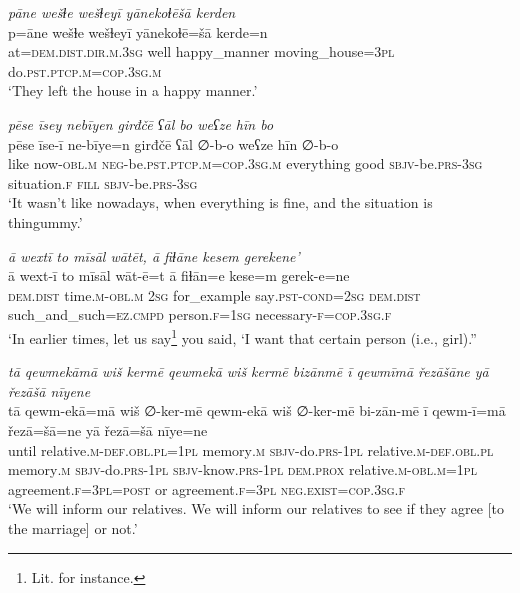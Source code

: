 \ea \label{ŽE.71}
\textit{pāne wešɫe wešɫeyī yānekoɫēšā kerden} \\ 
\gll p=āne wešɫe wešɫeyī yānekoɫē=šā kerde=n \\ 
 at=\textsc{dem.dist}\textsc{.dir}\textsc{.m}\textsc{.3sg} well happy\_manner moving\_house\textsc{=3pl} do\textsc{.pst}\textsc{.ptcp}\textsc{.m}\textsc{=cop}\textsc{.3sg}\textsc{.m} \\ 
\glt `They left the house in a happy manner.'
\z 
 
\ea \label{ŽE.72}
\textit{pēse īsey nebīyen girđčē ʕāl bo weʕze hīn bo} \\ 
\gll pēse īse-ī ne-bīye=n girđčē ʕāl ∅-b-o weʕze hīn ∅-b-o \\ 
  like now\textsc{-obl}\textsc{.m} \textsc{neg-}be\textsc{.pst}\textsc{.ptcp}\textsc{.m}\textsc{=cop}\textsc{.3sg}\textsc{.m} everything good \textsc{sbjv-}be\textsc{.prs}\textsc{-3sg} situation\textsc{.f} \textsc{fill} \textsc{sbjv-}be\textsc{.prs}\textsc{-3sg} \\ 
\glt `It wasn’t like nowadays, when everything is fine, and the situation is thingummy.'
\z 
 
\ea \label{ŽE.73}
\textit{ā wextī to mīsāl wātēt, ā fiɫāne kesem gerekene’} \\ 
\gll ā wext-ī to mīsāl wāt-ē=t ā fiɫān=e kese=m gerek-e=ne \\ 
 \textsc{dem.dist} time\textsc{.m}\textsc{-obl}\textsc{.m} \textsc{2sg} for\_example say\textsc{.pst}\textsc{-cond}\textsc{=\textsc{2sg}} \textsc{dem.dist} such\_and\_such\textsc{=ez}\textsc{.cmpd} person\textsc{.f}\textsc{=\textsc{1sg}} necessary\textsc{-f}\textsc{=cop}\textsc{.3sg}\textsc{.f} \\ 
\glt `In earlier times, let us say\footnote{Lit. for instance.} you said, ‘I want that certain person (i.e., girl).''
\z 
 
\ea \label{ŽE.83}
\textit{tā qewmekāmā wiš kermē qewmekā wiš kermē bizānmē ī qewmīmā řezāšāne yā řezāšā nīyene} \\ 
\gll tā qewm-ekā=mā wiš ∅-ker-mē qewm-ekā wiš ∅-ker-mē bi-zān-mē ī qewm-ī=mā řezā=šā=ne yā řezā=šā nīye=ne \\ 
 until relative\textsc{.m}\textsc{-def}\textsc{.obl}\textsc{.pl}\textsc{=1pl} memory\textsc{.m} \textsc{sbjv-}do\textsc{.prs}\textsc{-1pl} relative\textsc{.m}\textsc{-def}\textsc{.obl}\textsc{.pl} memory\textsc{.m} \textsc{sbjv-}do\textsc{.prs}\textsc{-1pl} \textsc{sbjv-}know\textsc{.prs}\textsc{-1pl} \textsc{dem.prox} relative\textsc{.m}\textsc{-obl}\textsc{.m}\textsc{=1pl} agreement\textsc{.f}\textsc{=3pl}\textsc{=\textsc{post}} or agreement\textsc{.f}\textsc{=3pl} \textsc{\textsc{neg.}exist}\textsc{=cop}\textsc{.3sg}\textsc{.f} \\ 
\glt `We will inform our relatives. We will inform our relatives to see if they agree [to the  marriage] or not.'
\z 
 
